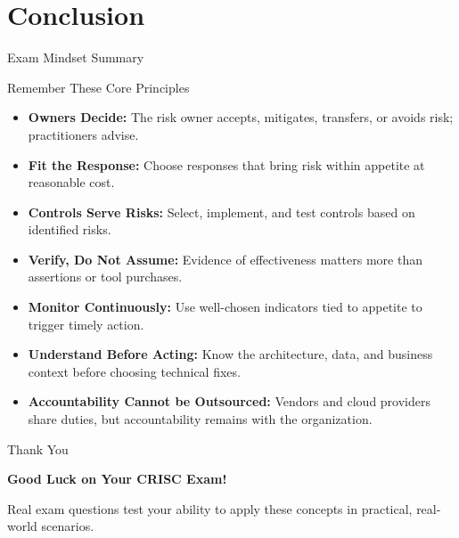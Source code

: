 \documentclass[aspectratio=169]{beamer}
\begin{document}
	\section{Conclusion}
	
	\begin{frame}{Exam Mindset Summary}
		\begin{block}{Remember These Core Principles}
			\begin{itemize}
				\item \textbf{Owners Decide:} The risk owner accepts, mitigates, transfers, or avoids risk; practitioners advise.
				\item \textbf{Fit the Response:} Choose responses that bring risk within appetite at reasonable cost.
				\item \textbf{Controls Serve Risks:} Select, implement, and test controls based on identified risks.
				\item \textbf{Verify, Do Not Assume:} Evidence of effectiveness matters more than assertions or tool purchases.
				\item \textbf{Monitor Continuously:} Use well-chosen indicators tied to appetite to trigger timely action.
				\item \textbf{Understand Before Acting:} Know the architecture, data, and business context before choosing technical fixes.
				\item \textbf{Accountability Cannot be Outsourced:} Vendors and cloud providers share duties, but accountability remains with the organization.
			\end{itemize}
		\end{block}
	\end{frame}
	
	\begin{frame}{Thank You}
		\begin{center}
			{\Huge \textbf{Good Luck on Your CRISC Exam!}}
			
			\vspace{1cm}
			
			\normalsize
			Real exam questions test your ability to apply these concepts in practical, real-world scenarios.
		\end{center}
	\end{frame}
	
\end{document}
